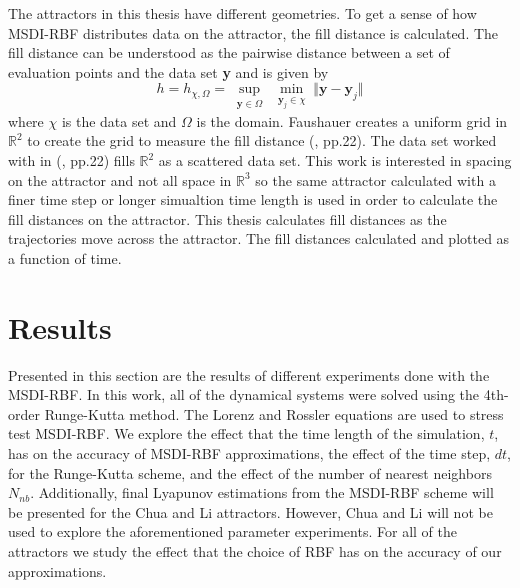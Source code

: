             The attractors in this thesis have different geometries. To get a sense of how MSDI-RBF distributes data on
            the attractor,
            the fill distance is calculated. The fill distance can be understood as the pairwise distance between a
            set of evaluation points and the data set \textbf{y} and is given by
            \begin{equation}
                h=h_{\chi,\Omega}=\sup_{\substack{\mathbf{y}\in\Omega}} \min_{\substack{\mathbf{y}_j\in\chi}}\Vert \mathbf{y}-\mathbf{y}_j \Vert
            \end{equation}
            where $\chi$ is the data set and $\Omega$ is the domain. Faushauer creates a uniform grid in $\mathbb{R}^2$
            to create the grid to measure the fill distance (\cite{item:1}, pp.22). The data set worked with in (\cite{item:1}, pp.22)
            fills $\mathbb{R}^2$ as a scattered data set. This work is interested in spacing on the attractor and not
            all space in $\mathbb{R}^3$ so the same attractor calculated with a finer time step or longer simualtion time length
            is used in order to calculate the fill distances on the attractor.
            This thesis calculates fill distances as the trajectories move across the attractor.
            The fill distances calculated and plotted as a function of time.\\

\chapter{Results}
\label{chap:results}

            Presented in this section are the results of different experiments done with the MSDI-RBF. In this work, all of the dynamical systems were solved using the 4th-order Runge-Kutta method. The Lorenz and
            Rossler equations are used to stress test MSDI-RBF.
            We explore the effect that the time length of the simulation, $t$,
            has on the accuracy of MSDI-RBF approximations, the effect of the time step, $dt$, for the Runge-Kutta scheme, and the
            effect of the number of nearest neighbors $N_{nb}$.
            Additionally, final Lyapunov estimations from the MSDI-RBF scheme will be presented for the Chua and Li attractors.
            However, Chua and Li will not be used to explore the aforementioned parameter experiments. For all of the attractors
            we study the effect that the choice of RBF has on the accuracy of our approximations.\\


